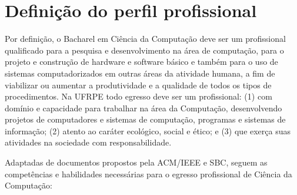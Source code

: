 \documentclass[
	12pt,				%
	openright,			%
  oneside,     %
	a4paper,			%
 hyphens,
	chapter=TITLE,		%
	english,			%
	french,				%
	spanish,			%
	brazil				%
	]{abntex2}
\begin{document}
\section{Definição do perfil profissional}

Por definição, o Bacharel em Ciência da Computação deve ser um profissional qualificado para a pesquisa e desenvolvimento na área de computação, para o projeto e construção de hardware e software básico e também para o uso de sistemas computadorizados em outras áreas da atividade humana, a fim de viabilizar ou aumentar a produtividade e a qualidade de todos os tipos de procedimentos. Na UFRPE todo egresso deve ser um profissional: (1) com domínio e capacidade para trabalhar na área da Computação, desenvolvendo projetos de computadores e sistemas de computação, programas e sistemas de informação; (2) atento ao caráter ecológico, social e ético; e (3) que exerça suas atividades na sociedade com responsabilidade.

Adaptadas de documentos propostos pela ACM/IEEE e SBC, seguem as competências e habilidades necessárias para o egresso profissional de Ciência da Computação:
\end{document}
